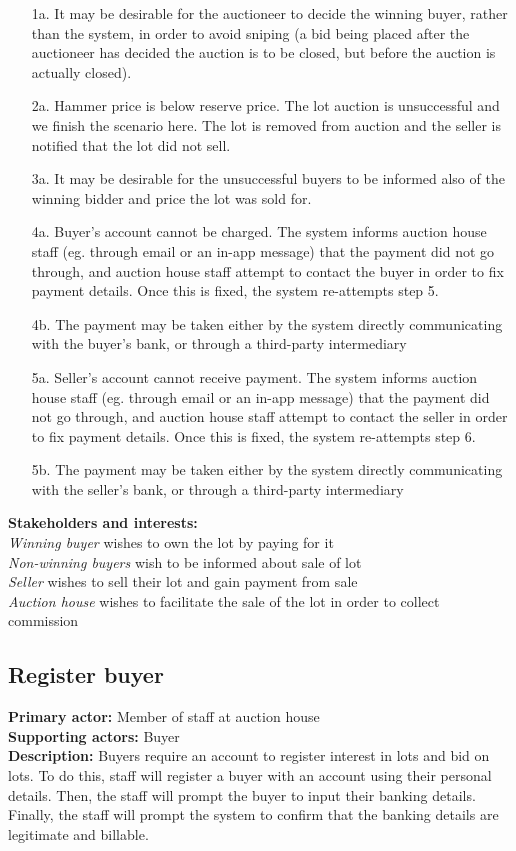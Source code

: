 \documentclass[titlepage, 12pt]{extarticle}
\begin{document}
\begin{itemize}
\item [1a.] It may be desirable for the auctioneer to decide the winning buyer, rather than the system, in order to avoid sniping (a bid being placed after the auctioneer has decided the auction is to be closed, but before the auction is actually closed). 
\item [2a.] Hammer price is below reserve price. The lot auction is unsuccessful and we finish the scenario here. The lot is removed from auction and the seller is notified that the lot did not sell.
\item [3a.] It may be desirable for the unsuccessful buyers to be informed also of the winning bidder and price the lot was sold for. 
\item [4a.] Buyer's account cannot be charged.  The system informs auction house staff (eg. through email or an in-app message) that the payment did not go through, and auction house staff attempt to contact the buyer in order to fix payment details. Once this is fixed, the system re-attempts step 5.
\item [4b.] The payment may be taken either by the system directly communicating with the buyer's bank, or through a third-party intermediary
\item [5a.] Seller's account cannot receive payment. The system informs auction house staff (eg. through email or an in-app message) that the payment did not go through, and auction house staff attempt to contact the seller in order to fix payment details. Once this is fixed, the system re-attempts step 6.
\item [5b.] The payment may be taken either by the system directly communicating with the seller's bank, or through a third-party intermediary
\end{itemize}
{\bf Stakeholders and interests: }
\\{\em Winning buyer} wishes to own the lot by paying for it
\\{\em Non-winning buyers} wish to be informed about sale of lot
\\{\em Seller} wishes to sell their lot and gain payment from sale
\\{\em Auction house} wishes to facilitate the sale of the lot in order to collect commission
\subsection{Register buyer}
{\bf Primary actor: } Member of staff at auction house
\\{\bf Supporting actors: } Buyer
\\{\bf Description: } Buyers require an account to register interest in lots and bid on lots. To do this, staff will register a buyer with an account using their personal details. Then, the staff will prompt the buyer to input their banking details. Finally, the staff will prompt the system to confirm that the banking details are legitimate and billable.
\end{document}
